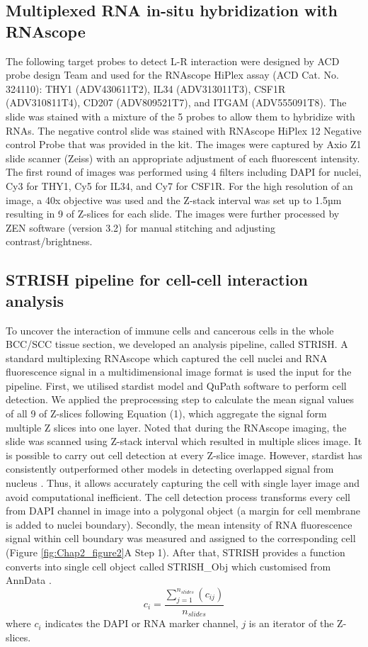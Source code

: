 \subsection{Multiplexed RNA in-situ hybridization with RNAscope}
The following target probes to detect L-R interaction were designed by ACD probe design Team and used for the RNAscope HiPlex assay (ACD Cat. No. 324110): THY1 (ADV430611T2), IL34 (ADV313011T3), CSF1R (ADV310811T4), CD207 (ADV809521T7), and ITGAM (ADV555091T8). The slide was stained with a mixture of the 5 probes to allow them to hybridize with RNAs. The negative control slide was stained with RNAscope HiPlex 12 Negative control Probe that was provided in the kit. The images were captured by Axio Z1 slide scanner (Zeiss) with an appropriate adjustment of each fluorescent intensity. The first round of images was performed using 4 filters including DAPI for nuclei, Cy3 for THY1, Cy5 for IL34, and Cy7 for CSF1R. For the high resolution of an image, a 40x objective was used and the Z-stack interval was set up to 1.5µm resulting in 9 of Z-slices for each slide. The images were further processed by ZEN software (version 3.2) for manual stitching and adjusting contrast/brightness.

\subsection{STRISH pipeline for cell-cell interaction analysis}
To uncover the interaction of immune cells and cancerous cells in the whole BCC/SCC tissue section, we developed an analysis pipeline, called STRISH. A standard multiplexing RNAscope which captured the cell nuclei and RNA fluorescence signal in a multidimensional image format is used the input for the pipeline. First, we utilised stardist \cite{schmidt2018cell} model and QuPath software \cite{bankhead2017qupath} to perform cell detection. We applied the preprocessing step to calculate the mean signal values of all 9 of Z-slices following Equation (1), which aggregate the signal form multiple Z slices into one layer. Noted that during the RNAscope imaging, the slide was scanned using Z-stack interval which resulted in multiple slices image. It is possible to carry out cell detection at every Z-slice image. However, stardist has consistently outperformed other models in detecting overlapped signal from nucleus \cite{schmidt2018cell}. Thus, it allows accurately capturing the cell with single layer image and avoid computational inefficient. The cell detection process transforms every cell from DAPI channel in image into a polygonal object (a margin for cell membrane is added to nuclei boundary). Secondly, the mean intensity of RNA fluorescence signal within cell boundary was measured and assigned to the corresponding cell (Figure \ref{fig:Chap2_figure2}A Step 1). After that, STRISH provides a function converts into single cell object called STRISH\_Obj which customised from AnnData \cite{wolf2018scanpy}. 
\begin{equation}
c_{i} = \frac{\sum_{j=1}^{n_{slides}}(c_{ij})}{n_{slides}}
\label{chap2:eq:01}
\end{equation}
where $c_i$ indicates the DAPI or RNA marker channel, $j$ is an iterator of the Z-slices.

